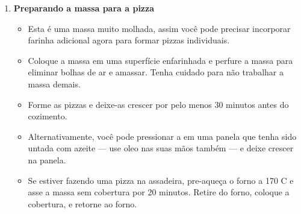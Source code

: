 \documentclass [11pt, letterpaper] {article}
\begin{document}
\begin {description}
\begin {enumerate}
\item {\bf Preparando a massa para a pizza}
\begin {itemize}
\item Esta é uma massa muito molhada, assim você pode precisar incorporar farinha adicional agora para formar pizzas individuais.
\item Coloque a massa em uma superfície enfarinhada e perfure a massa para eliminar bolhas de ar e amassar. Tenha cuidado para não trabalhar a massa demais.
\item Forme as pizzas e deixe-as crescer por pelo menos 30 minutos antes do cozimento.
\item Alternativamente, você pode pressionar a em uma panela que tenha sido untada com azeite --- use oleo nas suas m\~aos tamb\'em ---  e deixe crescer na panela.
\item Se estiver fazendo uma pizza na assadeira, pre-aque\c{c}a o forno a 170 C e asse a massa sem cobertura por 20 minutos. Retire do forno, coloque a cobertura, e retorne ao forno.
\end {itemize}

\end {enumerate}
\end {description}
\end{document}
